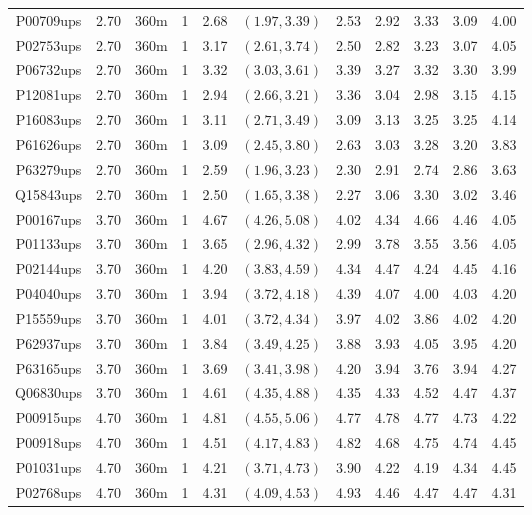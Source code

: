 \begin{landscape}
\begin{longtable}{cccc|cc|ccccc}
  P00709ups & 2.70 & 360m &   1 & 2.68 & $(1.97, 3.39)$ & 2.53 & 2.92 & 3.33 & 3.09 & 4.00 \\ 
  P02753ups & 2.70 & 360m &   1 & 3.17 & $(2.61, 3.74)$ & 2.50 & 2.82 & 3.23 & 3.07 & 4.05 \\ 
  P06732ups & 2.70 & 360m &   1 & 3.32 & $(3.03, 3.61)$ & 3.39 & 3.27 & 3.32 & 3.30 & 3.99 \\ 
  P12081ups & 2.70 & 360m &   1 & 2.94 & $(2.66, 3.21)$ & 3.36 & 3.04 & 2.98 & 3.15 & 4.15 \\ 
  P16083ups & 2.70 & 360m &   1 & 3.11 & $(2.71, 3.49)$ & 3.09 & 3.13 & 3.25 & 3.25 & 4.14 \\ 
  P61626ups & 2.70 & 360m &   1 & 3.09 & $(2.45, 3.80)$ & 2.63 & 3.03 & 3.28 & 3.20 & 3.83 \\ 
  P63279ups & 2.70 & 360m &   1 & 2.59 & $(1.96, 3.23)$ & 2.30 & 2.91 & 2.74 & 2.86 & 3.63 \\ 
  Q15843ups & 2.70 & 360m &   1 & 2.50 & $(1.65, 3.38)$ & 2.27 & 3.06 & 3.30 & 3.02 & 3.46 \\ 
  P00167ups & 3.70 & 360m &   1 & 4.67 & $(4.26, 5.08)$ & 4.02 & 4.34 & 4.66 & 4.46 & 4.05 \\ 
  P01133ups & 3.70 & 360m &   1 & 3.65 & $(2.96, 4.32)$ & 2.99 & 3.78 & 3.55 & 3.56 & 4.05 \\ 
  P02144ups & 3.70 & 360m &   1 & 4.20 & $(3.83, 4.59)$ & 4.34 & 4.47 & 4.24 & 4.45 & 4.16 \\ 
  P04040ups & 3.70 & 360m &   1 & 3.94 & $(3.72, 4.18)$ & 4.39 & 4.07 & 4.00 & 4.03 & 4.20 \\ 
  P15559ups & 3.70 & 360m &   1 & 4.01 & $(3.72, 4.34)$ & 3.97 & 4.02 & 3.86 & 4.02 & 4.20 \\ 
  P62937ups & 3.70 & 360m &   1 & 3.84 & $(3.49, 4.25)$ & 3.88 & 3.93 & 4.05 & 3.95 & 4.20 \\ 
  P63165ups & 3.70 & 360m &   1 & 3.69 & $(3.41, 3.98)$ & 4.20 & 3.94 & 3.76 & 3.94 & 4.27 \\ 
  Q06830ups & 3.70 & 360m &   1 & 4.61 & $(4.35, 4.88)$ & 4.35 & 4.33 & 4.52 & 4.47 & 4.37 \\ 
  P00915ups & 4.70 & 360m &   1 & 4.81 & $(4.55, 5.06)$ & 4.77 & 4.78 & 4.77 & 4.73 & 4.22 \\ 
  P00918ups & 4.70 & 360m &   1 & 4.51 & $(4.17, 4.83)$ & 4.82 & 4.68 & 4.75 & 4.74 & 4.45 \\ 
  P01031ups & 4.70 & 360m &   1 & 4.21 & $(3.71, 4.73)$ & 3.90 & 4.22 & 4.19 & 4.34 & 4.45 \\ 
  P02768ups & 4.70 & 360m &   1 & 4.31 & $(4.09, 4.53)$ & 4.93 & 4.46 & 4.47 & 4.47 & 4.31 \\ 

\end{longtable}
\end{landscape}
